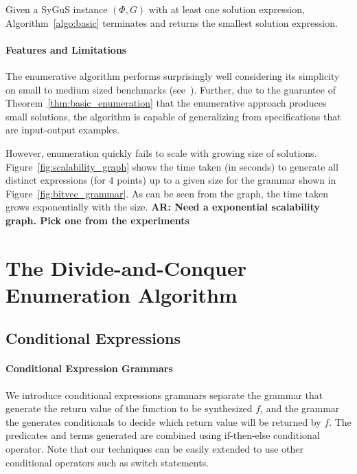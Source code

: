 \documentclass{llncs}
\newcommand\arsays[1]{{\bf AR: #1}}
\newcommand\Spec{\Phi}
\newcommand\Grammar{G}
\newcommand\SynthFun{f}
\begin{document}
\begin{theorem}
  \label{thm:basic_enumeration}
  Given a SyGuS instance $(\Spec, \Grammar)$ with at least one solution
  expression, Algorithm~\ref{algo:basic} terminates and returns the
  smallest solution expression.
\end{theorem}

\paragraph{Features and Limitations}
The enumerative algorithm performs surprisingly well considering its
simplicity on small to medium sized benchmarks
(see~\cite{Transit,sygus_reports,etc}).
Further, due to the guarantee of Theorem~\ref{thm:basic_enumeration}
that the enumerative approach produces small solutions, the algorithm is
capable of generalizing from specifications that are input-output
examples.

However, enumeration quickly fails to scale with growing size of
solutions.
Figure~\ref{fig:scalability_graph} shows the time taken (in seconds) to
generate all distinct expressions (for $4$ points) up to a given size
for the grammar shown in Figure~\ref{fig:bitvec_grammar}.
As can be seen from the graph, the time taken grows exponentially with
the size.
\arsays{Need a exponential scalability graph. Pick one from the
experiments}



\section{The Divide-and-Conquer Enumeration Algorithm}
\label{sec:algo}

\subsection{Conditional Expressions}

\paragraph{Conditional Expression Grammars}
We introduce conditional expressions grammars separate the grammar that
generate the return value of the function to be synthesized $\SynthFun$,
and the grammar the generates conditionals to decide which return value
will be returned by $\SynthFun$.
The predicates and terms generated are combined using if-then-else
conditional operator.
Note that our techniques can be easily extended to use other conditional
operators such as switch statements.
\end{document}
